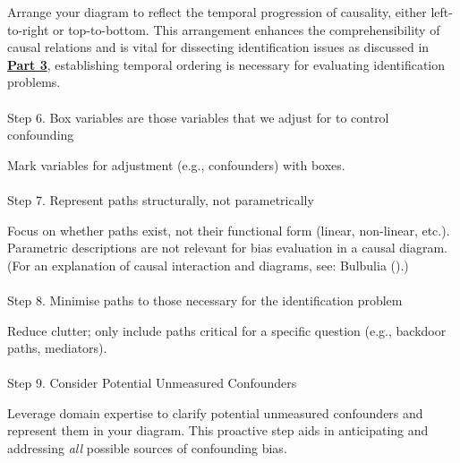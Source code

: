 \documentclass[
  single column]{article}
\makeatletter
\let\oldparagraph\paragraph
\renewcommand{\paragraph}{
    \@ifstar
      \xxxParagraphStar
      \xxxParagraphNoStar
  }
\newcommand{\xxxParagraphStar}[1]{\oldparagraph*{#1}\mbox{}}
\newcommand{\xxxParagraphNoStar}[1]{\oldparagraph{#1}\mbox{}}
\makeatother
\begin{document}
Arrange your diagram to reflect the temporal progression of causality,
either left-to-right or top-to-bottom. This arrangement enhances the
comprehensibility of causal relations and is vital for dissecting
identification issues as discussed in \hyperref[sec-part3]{\textbf{Part
3}}, establishing temporal ordering is necessary for evaluating
identification problems.

\paragraph{Step 6. Box variables are those variables that we adjust for
to control
confounding}\label{step-6.-box-variables-are-those-variables-that-we-adjust-for-to-control-confounding}

Mark variables for adjustment (e.g., confounders) with boxes.

\paragraph{Step 7. Represent paths structurally, not
parametrically}\label{step-7.-represent-paths-structurally-not-parametrically}

Focus on whether paths exist, not their functional form (linear,
non-linear, etc.). Parametric descriptions are not relevant for bias
evaluation in a causal diagram. (For an explanation of causal
interaction and diagrams, see: Bulbulia
().)

\paragraph{Step 8. Minimise paths to those necessary for the
identification
problem}\label{step-8.-minimise-paths-to-those-necessary-for-the-identification-problem}

Reduce clutter; only include paths critical for a specific question
(e.g., backdoor paths, mediators).

\paragraph{Step 9. Consider Potential Unmeasured
Confounders}\label{step-9.-consider-potential-unmeasured-confounders}

Leverage domain expertise to clarify potential unmeasured confounders
and represent them in your diagram. This proactive step aids in
anticipating and addressing \emph{all} possible sources of confounding
bias.
\end{document}
